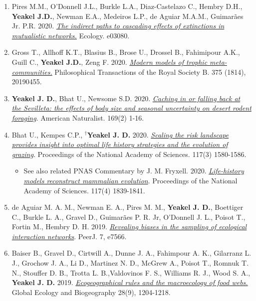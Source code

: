 \documentclass[margin,line,12pt]{res}
\begin{document}
\begin{resume}
\begin{enumerate}
\item Pires M.M., O'Donnell J.L., Burkle L.A., Diaz-Castelazo C., Hembry D.H., \textbf{Yeakel J.D.}, Newman E.A., Medeiros L.P., de Aguiar M.A.M., Guimar\~aes Jr. P.R. 2020. \href{https://esajournals.onlinelibrary.wiley.com/doi/pdf/10.1002/ecy.3080}{\emph{The indirect paths to cascading effects of extinctions in mutualistic networks.}} Ecology. e03080.

\item Gross T., Allhoff K.T., Blasius B., Brose U., Drossel B., Fahimipour A.K., Guill C., \textbf{Yeakel J.D.}, Zeng F. 2020. \href{https://royalsocietypublishing.org/doi/pdf/10.1098/rstb.2019.0455}{\emph{Modern models of trophic meta-communities.}} Philosophical Transactions of the Royal Society B. 375 (1814), 20190455.

\item \textbf{Yeakel J. D.}, Bhat U., Newsome S.D. 2020. \href{https://www.journals.uchicago.edu/doi/10.1086/709019}{\emph{Caching in or falling back at the Sevilleta: the effects of body size and seasonal uncertainty on desert rodent foraging}}. American Naturalist. 169(2) 1-16.

\item Bhat U., Kempes C.P., \textbf{${}^\dag$Yeakel J. D.} 2020. \href{https://doi.org/10.1073/pnas.1907998117}{\emph{Scaling the risk landscape provides insight into optimal life history strategies and the evolution of grazing}}. Proceedings of the National Academy of Sciences.  117(3) 1580-1586.
  {\footnotesize
	\begin{itemize}
		\item See also related PNAS Commentary by J. M. Fryxell. 2020. \href{https://www.pnas.org/content/117/4/1839}{\emph{Life-history models reconstruct mammalian evolution}}. Proceedings of the National Academy of Sciences. 117(4) 1839-1841.
	\end{itemize}
  }
\item de Aguiar M. A. M., Newman E. A., Pires M. M., \textbf{Yeakel J. D.}, Boettiger C., Burkle L. A., Gravel D., Guimar\~aes P. R. Jr, O’Donnell J. L., Poisot T., Fortin M., Hembry D. H. 2019. \href{https://peerj.com/articles/7566/}{\emph{Revealing biases in the sampling of ecological interaction networks}}. PeerJ. 7, e7566.

\item Baiser B., Gravel D., Cirtwill A., Dunne J. A., Fahimpour A. K., Gilarranz L. J., Grochow J. A., Li D., Martinez N. D., McGrew A., Poisot T., Romnuk T. N., Stouffer D. B., Trotta L. B.,Valdovinos F. S., Williams R. J., Wood S. A., \textbf{Yeakel J. D.} 2019. \href{https://onlinelibrary.wiley.com/doi/abs/10.1111/geb.12925}{\emph{Ecogeographical rules and the macroecology of food webs.}} Global Ecology and Biogeography 28(9), 1204-1218.


\end{enumerate}
\end{resume}
\end{document}
